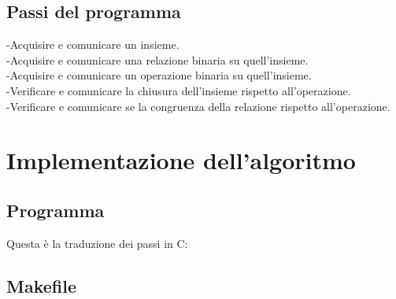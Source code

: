 ﻿\documentclass[11pt,a4paper,titlepage,block]{article}
\begin{document}
	\subsection{Passi del programma}
	-Acquisire e comunicare un insieme.\\
	-Acquisire e comunicare una relazione binaria su quell'insieme.\\
	-Acquisire e comunicare un operazione binaria su quell'insieme.\\
	-Verificare e comunicare la chiusura dell'insieme rispetto all'operazione.\\
	-Verificare e comunicare se la congruenza della relazione rispetto all'operazione.\\
	\newpage
	\section{Implementazione dell'algoritmo}
	\subsection{Programma}
	Questa è la traduzione dei passi in C:
	

	
\newpage
	\subsection{Makefile}


\newpage
\end{document}
